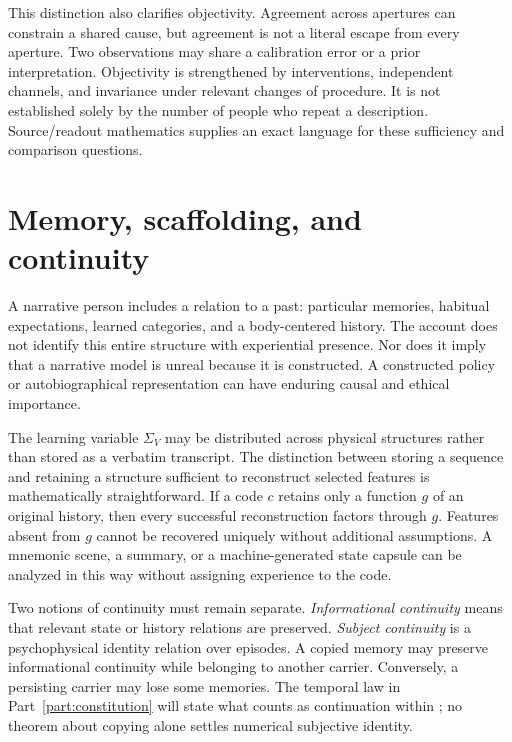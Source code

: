 This distinction also clarifies objectivity. Agreement across apertures can constrain a shared cause, but agreement is not a literal escape from every aperture. Two observations may share a calibration error or a prior interpretation. Objectivity is strengthened by interventions, independent channels, and invariance under relevant changes of procedure. It is not established solely by the number of people who repeat a description. Source/readout mathematics supplies an exact language for these sufficiency and comparison questions.

\section{Memory, scaffolding, and continuity}\label{section:distinctions:memory-scaffolding-and-continuity}
A narrative person includes a relation to a past: particular memories, habitual expectations, learned categories, and a body-centered history. The account does not identify this entire structure with experiential presence. Nor does it imply that a narrative model is unreal because it is constructed. A constructed policy or autobiographical representation can have enduring causal and ethical importance.

The learning variable $\Sigma_V$ may be distributed across physical structures rather than stored as a verbatim transcript. The distinction between storing a sequence and retaining a structure sufficient to reconstruct selected features is mathematically straightforward. If a code $c$ retains only a function $g$ of an original history, then every successful reconstruction factors through $g$. Features absent from $g$ cannot be recovered uniquely without additional assumptions. A mnemonic scene, a summary, or a machine-generated state capsule can be analyzed in this way without assigning experience to the code.

Two notions of continuity must remain separate. \emph{Informational continuity} means that relevant state or history relations are preserved. \emph{Subject continuity} is a psychophysical identity relation over episodes. A copied memory may preserve informational continuity while belonging to another carrier. Conversely, a persisting carrier may lose some memories. The temporal law in Part~\ref{part:constitution} will state what counts as continuation within \spctwo; no theorem about copying alone settles numerical subjective identity.

